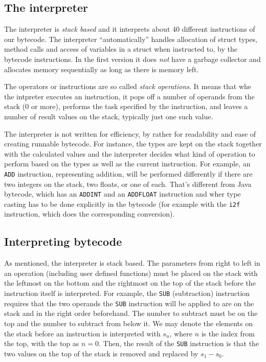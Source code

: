 \documentclass[11pt]{article}
\begin{document}
\subsection{The interpreter}
\label{sec:org5c46982}

The interpreter is \emph{stack based} and it interprets about 40 different
instructions of our bytecode.  The interpreter ``automatically'' handles
allocation of struct types, method calls and access of variables in a
struct when instructed to, by the bytecode instructions. In the first
version it does \emph{not} have a garbage collector and allocates memory
sequentially as long as there is memory left.

The operators or instructions are so called \emph{stack operations}. It means that
whe the intpreter executes an instruction, it pops off a number of operands
from the stack (0 or more), performs the task specified by the instruction,
and leaves a number of result values on the stack, typically just one such
value.

The interpreter is not written for efficiency, by rather for readability
and ease of creating runnable bytecode. For instance, the types are kept on
the stack together with the calculated values and the interpreter decides
what kind of operation to perform based on the types as well as the current
instruction. For example, an \texttt{ADD} instruction, representing addition, will
be performed differently if there are two integers on the stack, two
floats, or one of each. That's different from Java bytecode, which has an
\texttt{ADDINT} and an \texttt{ADDFLOAT} instruction and wher type casting has to be done
explicitly in the bytecode (for example with the \texttt{i2f} instruction, which
does the corresponding conversion).

\subsection{Interpreting bytecode}
\label{sec:org5332c98}


As mentioned, the interpreter is stack based. The parameters from right to
left in an operation (including user defined functions) must be placed on
the stack with the leftmost on the bottom and the rightmost on the top of
the stack before the instruction itself is interpreted. For example, the
\texttt{SUB} (subtraction) instruction requires that the two operands the \texttt{SUB}
instruction will be applied to are on the stack and in the right order
beforehand. The number to subtract must be on the top and the number to
subtract from below it. We may denote the elements on the stack before an
instruction is interpreted with \(s_n\), where \(n\) is the index from the top,
with the top as \(n = 0\). Then, the result of the \texttt{SUB} instruction is that
the two values on the top of the stack is removed and replaced by \(s_1 -
s_0\).
\end{document}
